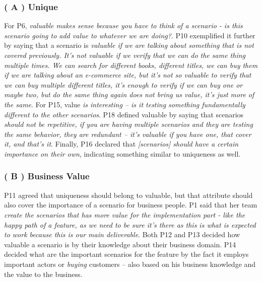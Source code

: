 \subsubsection{\textbf{( A ) Unique}}
For P6, \textit{valuable makes sense because you have to think of a scenario - is this scenario going to add value to whatever we are doing?}. P10 exemplified it further by saying that a scenario is \textit{valuable if we are talking about something that is not covered previously. It's not valuable if we verify that we can do the same thing multiple times. We can search for different books, different titles, we can buy them if we are talking about an e-commerce site, but it's not so valuable to verify that we can buy multiple different titles, it's enough to verify if we can buy one or maybe two, but do the same thing again does not bring us value, it's just more of the same}. For P15, value \textit{is interesting -- is it testing something fundamentally different to the other scenarios}. P18 defined valuable by saying that scenarios \textit{should not be repetitive, if you are having multiple scenarios and they are testing the same behavior, they are redundant -- it's valuable if you have one, that cover it, and that's it}. Finally, P16 declared that \textit{[scenarios] should have a certain importance on their own}, indicating something similar to uniqueness as well.

\subsubsection{\textbf{( B ) Business Value}}
P11 agreed that uniqueness should belong to valuable, but that attribute should also cover the importance of a scenario for business people. P1 said that her team \textit{create the scenarios that has more value for the implementation part - like the happy path of a feature, as we need to be sure it's there as this is what is expected to work because this is our main deliverable}. Both P12 and P13 decided how valuable a scenario is by their knowledge about their business domain. P14 decided what are the important scenarios for the feature by the fact it employs important actors or \textit{buying} customers -- also based on his business knowledge and the value to the business.

